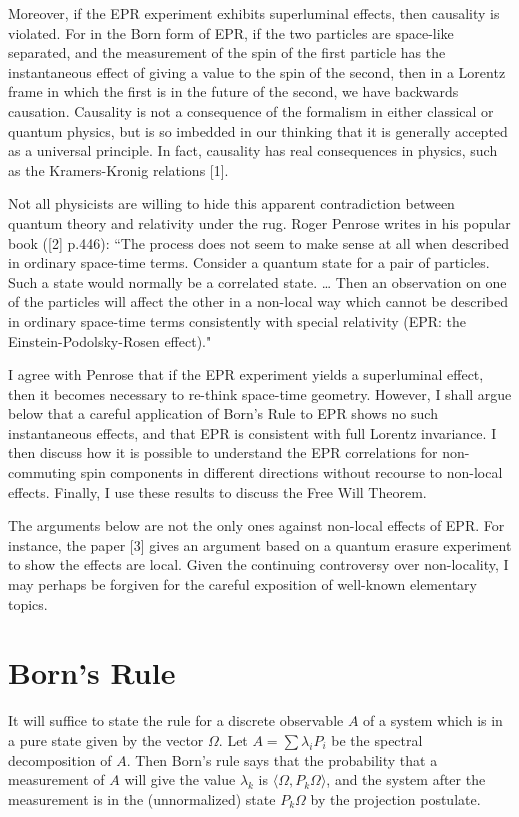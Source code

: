 \documentclass[12pt]{article}
\begin{document}
Moreover, if the EPR experiment exhibits superluminal effects, then causality is violated. For in the Born form of EPR, if the two particles are space-like separated, and the measurement of the spin of the first particle has the instantaneous effect of giving a value to the spin of the second, then in a Lorentz frame in which the first is in the future of the second, we have backwards causation. Causality is not a consequence of the formalism in either classical or quantum physics, but is so imbedded in our thinking that it is generally accepted as a universal principle. In fact, causality has real consequences in physics, such as the Kramers-Kronig relations [1].

Not all physicists are willing to hide this apparent contradiction between quantum theory and relativity under the rug. Roger Penrose writes in his popular book ([2] p.446):
``The process does not seem to make sense at all when described in ordinary space-time terms. Consider a quantum state for a pair of particles. Such a state would normally be a correlated state. … Then an observation on one of the particles will affect the other in a non-local way which cannot be described in ordinary space-time terms consistently with special relativity (EPR: the Einstein-Podolsky-Rosen effect)."

I agree with Penrose that if the EPR experiment yields a superluminal effect, then it becomes necessary to re-think space-time geometry. However, I shall argue below that a careful application of  Born's Rule to EPR shows no such instantaneous effects, and that EPR is consistent with full Lorentz invariance. I then discuss how it is possible to understand the EPR correlations for non-commuting spin components in different directions without recourse to non-local effects. Finally, I use these results to discuss the Free Will Theorem. 

The arguments below are not the only ones against non-local effects of EPR. For instance, the paper [3] gives an argument based on a quantum erasure experiment to show the effects are local. Given the continuing controversy over non-locality, I may perhaps be forgiven for the careful exposition of well-known elementary topics.  

\section{Born's Rule}
It will suffice to state the rule for a discrete observable $A$ of a system which is in a pure state given by the vector $\Omega$. Let $A = \sum \lambda_i P_i$  be the spectral decomposition of $A$. Then Born's rule says that the probability that a measurement of $A$ will give the value $\lambda_k$  is $\langle \Omega, P_k \Omega \rangle$, and the system after the measurement is in the (unnormalized) state $P_k\Omega$ by the projection postulate.
\end{document}
